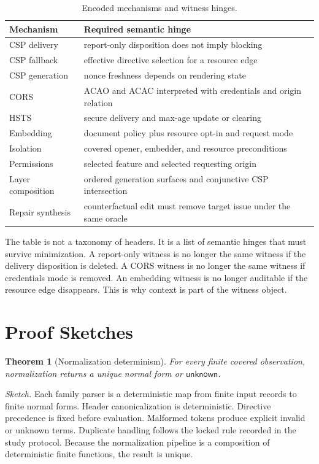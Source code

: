 \documentclass[10pt,conference]{IEEEtran}
\newtheorem{theorem}{Theorem}
\newcommand{\unknown}{\ensuremath{\mathsf{unknown}}}
\begin{document}
\begin{table}[t]
\centering
\caption{Encoded mechanisms and witness hinges.}
\label{tab:supp-hinges}
\begin{tabular}{p{}p{}}
\toprule
Mechanism & Required semantic hinge \\
\midrule
CSP delivery & report-only disposition does not imply blocking \\
CSP fallback & effective directive selection for a resource edge \\
CSP generation & nonce freshness depends on rendering state \\
CORS & ACAO and ACAC interpreted with credentials and origin relation \\
HSTS & secure delivery and max-age update or clearing \\
Embedding & document policy plus resource opt-in and request mode \\
Isolation & covered opener, embedder, and resource preconditions \\
Permissions & selected feature and selected requesting origin \\
Layer composition & ordered generation surfaces and conjunctive CSP intersection \\
Repair synthesis & counterfactual edit must remove target issue under the same oracle \\
\bottomrule
\end{tabular}
\end{table}

The table is not a taxonomy of headers. It is a list of semantic hinges that must survive minimization. A report-only witness is no longer the same witness if the delivery disposition is deleted. A CORS witness is no longer the same witness if credentials mode is removed. An embedding witness is no longer auditable if the resource edge disappears. This is why context is part of the witness object.

\section{Proof Sketches}

\begin{theorem}[Normalization determinism]
For every finite covered observation, normalization returns a unique normal form or \unknown{}.
\end{theorem}
\emph{Sketch.} Each family parser is a deterministic map from finite input records to finite normal forms. Header canonicalization is deterministic. Directive precedence is fixed before evaluation. Malformed tokens produce explicit invalid or unknown terms. Duplicate handling follows the locked rule recorded in the study protocol. Because the normalization pipeline is a composition of deterministic finite functions, the result is unique.
\end{document}

